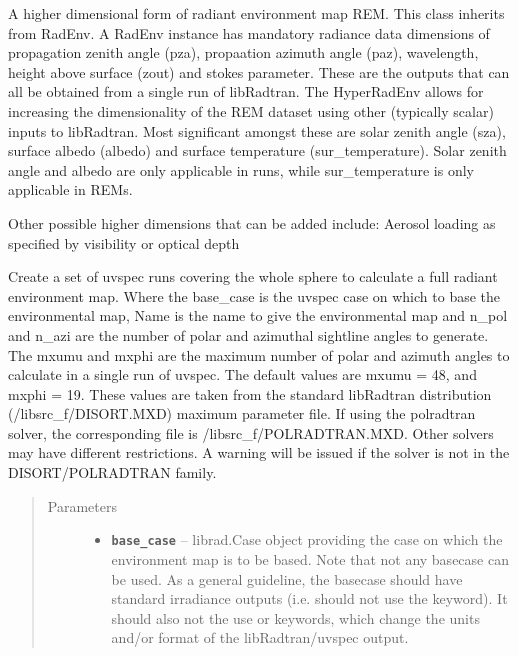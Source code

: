 \documentclass[a4paper,10pt,english]{sphinxmanual}
\begin{document}

\begin{fulllineitems}
\label{packages:librad.HyperRadEnv}
A higher dimensional form of radiant environment map REM. This class inherits from RadEnv.
A RadEnv instance has mandatory radiance data dimensions of propagation zenith angle (pza), propaation azimuth
angle (paz), wavelength, height above surface (zout) and stokes parameter. These are the outputs that can all
be obtained from a single run of libRadtran. The HyperRadEnv allows for increasing the dimensionality of the
REM dataset using other (typically scalar) inputs to libRadtran. Most significant amongst these are solar
zenith angle (sza), surface albedo (albedo) and surface temperature (sur\_temperature). Solar zenith angle and
albedo are only applicable in  runs, while sur\_temperature is only applicable in 
REMs.

Other possible higher dimensions that can be added include:
Aerosol loading as specified by visibility or optical depth

Create a set of uvspec runs covering the whole sphere to calculate a full radiant environment map.
Where the base\_case is the uvspec case on which to base the environmental map, Name is the name to give the
environmental map and n\_pol and n\_azi are the number of polar and azimuthal sightline angles to generate. The
mxumu and mxphi are the maximum number of polar and azimuth angles to calculate in a single run of uvspec.
The default values are mxumu = 48, and mxphi = 19. These values are taken from the standard libRadtran
distribution (/libsrc\_f/DISORT.MXD) maximum parameter file. If using the polradtran solver, the corresponding
file is /libsrc\_f/POLRADTRAN.MXD. Other solvers may have different restrictions. A warning will be issued if
the solver is not in the DISORT/POLRADTRAN family.
\begin{quote}\begin{description}
\item[{Parameters}] \leavevmode\begin{itemize}
\item {} 
\textbf{\texttt{base\_case}} -- 
librad.Case object providing the case on which the environment map is to be based. Note
that not any basecase can be used. As a general guideline, the basecase should have standard irradiance
outputs (i.e. should not use the  keyword). It should also not the use  or
 keywords, which change the units and/or format of the libRadtran/uvspec output.
\begin{quote}


\end{quote}
\end{itemize}
\end{description}
\end{quote}
\end{fulllineitems}
\end{document}
